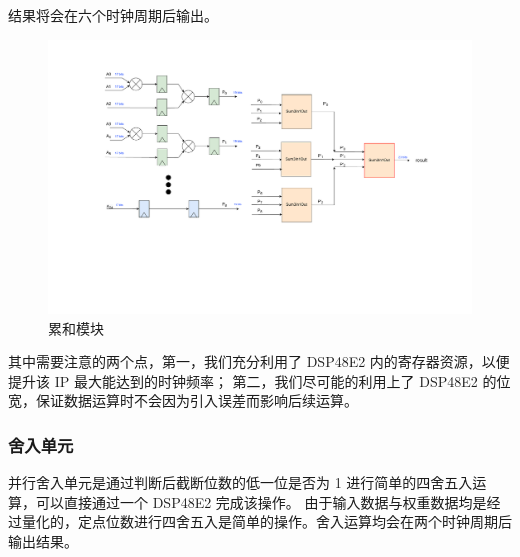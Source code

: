 \documentclass[12pt, a4paper, oneside]{ctexbook}
\begin{document}
	结果将会在六个时钟周期后输出。\par 
	\begin{figure}[h]
		\centering
		\includegraphics[scale=0.52]{pic/sum}
		\caption{累和模块}
		\label{sum}
	\end{figure}
	其中需要注意的两个点，第一，我们充分利用了 DSP48E2 内的寄存器资源，以便提升该 IP 最大能达到的时钟频率；
	第二，我们尽可能的利用上了 DSP48E2 的位宽，保证数据运算时不会因为引入误差而影响后续运算。
	
	\subsubsection{舍入单元}\label{round_unit}
	并行舍入单元是通过判断后截断位数的低一位是否为 1 进行简单的四舍五入运算，可以直接通过一个 DSP48E2 完成该操作。
	由于输入数据与权重数据均是经过量化的，定点位数进行四舍五入是简单的操作。舍入运算均会在两个时钟周期后输出结果。
	
\end{document}
